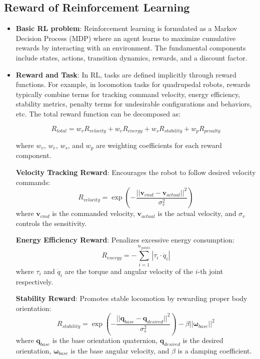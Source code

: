 \documentclass[11pt]{article}
\begin{document}
\subsection{Reward of Reinforcement Learning}
\begin{itemize}
    \item \textbf{Basic RL problem}: Reinforcement learning is formulated as a Markov Decision Process (MDP) where an agent learns to maximize cumulative rewards by interacting with an environment. The fundamental components include states, actions, transition dynamics, rewards, and a discount factor.
    
    \item \textbf{Reward and Task}: In RL, tasks are defined implicitly through reward functions. For example, in locomotion tasks for quadrupedal robots, rewards typically combine terms for tracking command velocity, energy efficiency, stability metrics, penalty terms for undesirable configurations and behaviors, etc. The total reward function can be decomposed as:
    
    \begin{equation}
    R_{total} = w_v R_{velocity} + w_e R_{energy} + w_s R_{stability} + w_p R_{penalty}
    \end{equation}
    
    where $w_v$, $w_e$, $w_s$, and $w_p$ are weighting coefficients for each reward component.
    
    \textbf{Velocity Tracking Reward}: Encourages the robot to follow desired velocity commands:
    \begin{equation}
    R_{velocity} = \exp\left(-\frac{||\mathbf{v}_{cmd} - \mathbf{v}_{actual}||^2}{\sigma_v^2}\right)
    \end{equation}
    where $\mathbf{v}_{cmd}$ is the commanded velocity, $\mathbf{v}_{actual}$ is the actual velocity, and $\sigma_v$ controls the sensitivity.
    
    \textbf{Energy Efficiency Reward}: Penalizes excessive energy consumption:
    \begin{equation}
    R_{energy} = -\sum_{i=1}^{n_{joints}} |\tau_i \cdot \dot{q}_i|
    \end{equation}
    where $\tau_i$ and $\dot{q}_i$ are the torque and angular velocity of the $i$-th joint respectively.
    
    \textbf{Stability Reward}: Promotes stable locomotion by rewarding proper body orientation:
    \begin{equation}
    R_{stability} = \exp\left(-\frac{||\mathbf{q}_{base} - \mathbf{q}_{desired}||^2}{\sigma_s^2}\right) - \beta ||\boldsymbol{\omega}_{base}||^2
    \end{equation}
    where $\mathbf{q}_{base}$ is the base orientation quaternion, $\mathbf{q}_{desired}$ is the desired orientation, $\boldsymbol{\omega}_{base}$ is the base angular velocity, and $\beta$ is a damping coefficient.
    

\end{itemize}
\end{document}
